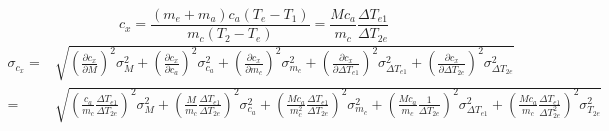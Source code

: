\documentclass{article}
\begin{document}
	\[ 
	c_{x} = \frac{(m_{e} + m_{a})c_{a}(T_{e} - T_{1})}{m_{c}(T_{2}-T_{e})} = \frac{Mc_{a}}{m_{c}}\frac{\Delta T_{e1}}{\Delta T_{2e}}
	\]
	\begin{align*}
		\sigma_{c_{x}} =&  \sqrt{\left(\frac{\partial c_{x}}{\partial M}\right)^2\sigma_{M}^2 + \left(\frac{\partial c_{x}}{\partial c_{a}}\right)^2\sigma_{c_{a}}^2 + \left(\frac{\partial c_{x}}{\partial m_{c}}\right)^2\sigma_{m_{c}}^2+ \left(\frac{\partial c_{x}}{\partial\Delta T_{e1}}\right)^2\sigma_{\Delta T_{e1}}^2 + \left(\frac{\partial c_{x}}{\partial \Delta T_{2e}}\right)^2\sigma^2_{\Delta T_{2e}}} \\
		 =& \sqrt{\left(\frac{c_{a}}{m_{c}}\frac{\Delta T_{e1}}{\Delta T_{2e}}\right)^2\sigma^2_{M} + \left( \frac{M}{m_{c}}\frac{\Delta T_{e1}}{\Delta T_{2e}} \right)^2\sigma_{c_{a}}^2 + \left(\frac{Mc_{a}}{m_{c}^2}\frac{\Delta T_{e1}}{\Delta T_{2e}}\right)^2 \sigma_{m_{c}}^2 + \left(\frac{Mc_{a}}{m_{c}}\frac{1}{\Delta T_{2e}}\right)^2\sigma_{\Delta T_{e1}}^2 + \left(\frac{Mc_{a}}{m_{c}}\frac{\Delta T_{e1}}{\Delta T_{2e}^2}\right)^2\sigma_{T_{2e}}^2}
	\end{align*}
	
	
\end{document}
